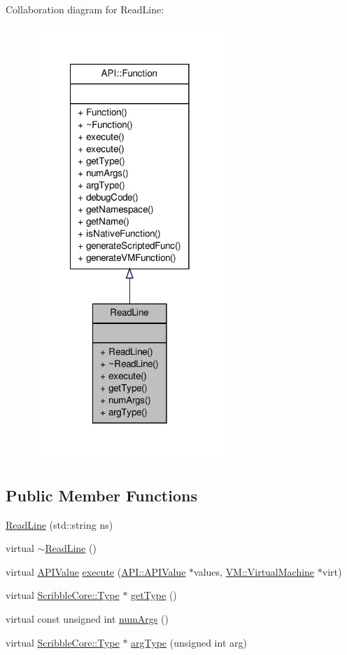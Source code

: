 Collaboration diagram for Read\-Line\-:
\nopagebreak
\begin{figure}[H]
\begin{center}
\leavevmode
\includegraphics[width=206pt]{class_read_line__coll__graph}
\end{center}
\end{figure}
\subsection*{Public Member Functions}
\begin{DoxyCompactItemize}
\item 
\hyperlink{class_read_line_a5fc24cc126c9176422adf954f724447d}{Read\-Line} (std\-::string ns)
\item 
virtual \hyperlink{class_read_line_a4e6f42e3fa247536d1ed56ec654881b4}{$\sim$\-Read\-Line} ()
\item 
virtual \hyperlink{class_a_p_i_1_1_a_p_i_value}{A\-P\-I\-Value} \hyperlink{class_read_line_af8556982e83b2417b4fad7ed3086a7de}{execute} (\hyperlink{class_a_p_i_1_1_a_p_i_value}{A\-P\-I\-::\-A\-P\-I\-Value} $\ast$values, \hyperlink{class_v_m_1_1_virtual_machine}{V\-M\-::\-Virtual\-Machine} $\ast$virt)
\item 
virtual \hyperlink{class_scribble_core_1_1_type}{Scribble\-Core\-::\-Type} $\ast$ \hyperlink{class_read_line_a4d3200e2e4a782723a05c7ef46c54c41}{get\-Type} ()
\item 
virtual const unsigned int \hyperlink{class_read_line_a23cd17ab8815243caa045e19e7229a15}{num\-Args} ()
\item 
virtual \hyperlink{class_scribble_core_1_1_type}{Scribble\-Core\-::\-Type} $\ast$ \hyperlink{class_read_line_aad1c4056e2c7006e1a065b6447f23255}{arg\-Type} (unsigned int arg)
\end{DoxyCompactItemize}

